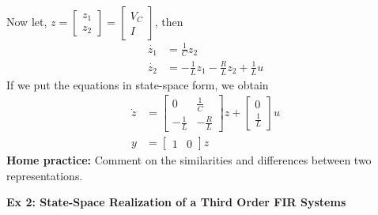 \documentclass[twoside]{article}
\begin{document}
Now let, $z = \left[ \begin{array}{c} z_1 \\ z_2 \end{array} \right] =
\left[ \begin{array}{c} V_C \\ I \end{array} \right]$, then 
%
\begin{align*}
	\dot{z_1} &= \frac{1}{C} z_2 \\
	\dot{z_2} &= -\frac{1}{L} z_1 - \frac{R}{L} z_2 + \frac{1}{L} u
\end{align*}
%
If we put the equations in state-space form, we obtain
%
\begin{align*}
 \dot{z} &= \left[  \begin{array}{cc} 0 & \frac{1}{C} \\ -\frac{1}{L} &  -\frac{R}{L}  \end{array} \right] z 
 +  \left[  \begin{array}{c} 0 \\ \frac{1}{L} \end{array} \right] u
 \\
 y &= \left[  \begin{array}{cc} 1 & 0 \end{array} \right] z
\end{align*}
%
\textbf{Home practice:} Comment on the similarities and differences between two representations.

\newpage

\textbf{Ex 2: State-Space Realization of a Third Order FIR Systems}
\end{document}
